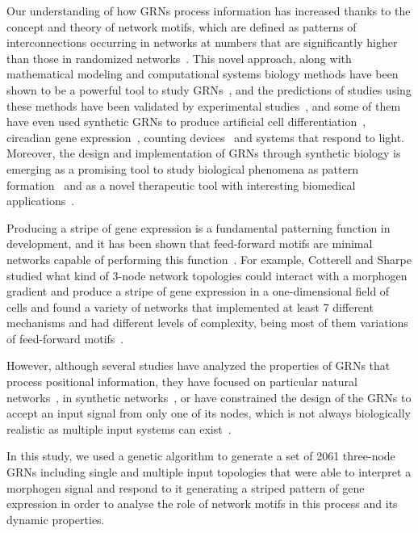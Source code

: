 \documentclass[10pt,letterpaper]{article}
\begin{document}
Our understanding of how GRNs process information has increased thanks to the
concept and theory of network motifs, which are defined as patterns of
interconnections occurring in networks at numbers that are significantly higher
than those in randomized networks~\cite{Milo2002}. This novel approach, along
with mathematical modeling and computational systems biology methods have been
shown to be a powerful tool to study GRNs~\cite{kitano_computational_2002}, and
the predictions of studies using these methods have been validated by
experimental studies~\cite{Kalir2005,Kalir2004,Mangan2003a,ODonnell2005}, and
some of them have even used synthetic GRNs to produce artificial cell
differentiation~\cite{Basu2005}, circadian gene
expression~\cite{atkinson_development_2003}, counting
devices~\cite{friedland_synthetic_2009} and systems that respond to light.
Moreover, the design and implementation of GRNs through synthetic biology is
emerging as a promising tool to study biological phenomena as pattern
formation~\cite{santos-moreno_using_2019} and as a novel therapeutic tool with
interesting biomedical applications~\cite{karlsson_therapeutic_2012,
higashikuni_advancing_2017,abil_synthetic_2015,healy_genetic_2019,
kitada_programming_2018}.

Producing a stripe of gene expression is a fundamental patterning function
in development, and it has been shown that feed-forward motifs are minimal
networks capable of performing this function~\cite{munteanu_2014}. For example,
Cotterell and Sharpe studied what kind of 3-node network topologies could
interact with a morphogen gradient and produce a stripe of gene expression
in a one-dimensional field of cells and found a variety of networks that
implemented at least 7 different mechanisms and had different levels of
complexity, being most of them variations of feed-forward motifs~\cite{Cotterell2010}.

However, although several studies have analyzed the properties of GRNs that
process positional information, they have focused on particular natural
networks~\cite{Schaerli2014,Jaeger2004}, in synthetic networks~\cite{Basu2005,
Reinitz1995,Schaerli2018,Elowitz2000}, or have constrained the
design of the GRNs to accept an input signal from only one of its nodes, which is
not always biologically realistic as multiple input systems can exist~\cite{Cotterell2010,
munteanu_2014, Schaerli2014}.

In this study, we used a genetic algorithm to generate a set of 2061 three-node GRNs
including single and multiple input topologies that were able to interpret a morphogen
signal and respond to it generating a striped pattern of gene expression in order to
analyse the role of network motifs in this process and its dynamic properties.
\end{document}

